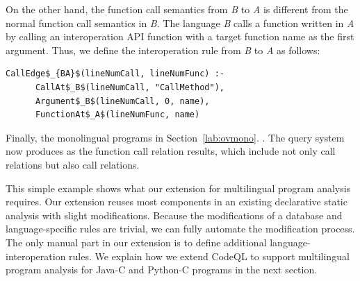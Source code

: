\noindent
On the other hand, the function call semantics from {\it B} to {\it A} is
different from the normal function call semantics in {\it B}. The language {\it
B} calls a function written in {\it A} by calling an interoperation API
function  with a target function name as the first argument.
Thus, we define the interoperation rule from {\it B} to {\it A} as follows:

\begin{lstlisting}[style=mrule]
    CallEdge$_{BA}$(lineNumCall, lineNumFunc) :-
      CallAt$_B$(lineNumCall, "CallMethod"),
      Argument$_B$(lineNumCall, 0, name),
      FunctionAt$_A$(lineNumFunc, name)
\end{lstlisting}

Finally,    the
monolingual programs in Section~\ref{lab:ovmono}.  . The query system now produces
  as the function call
relation results, which include not only  call relations but also
 call relations.

This simple example shows what our extension for multilingual program analysis
requires. Our extension reuses most components in an existing declarative
static analysis with slight modifications. Because the modifications of a
database and language-specific rules are trivial, we can fully automate the
modification process.  The only manual part in our extension is to define
additional language-interoperation rules. We explain how we extend CodeQL to
support multilingual program analysis for Java-C and Python-C programs in the
next section.

